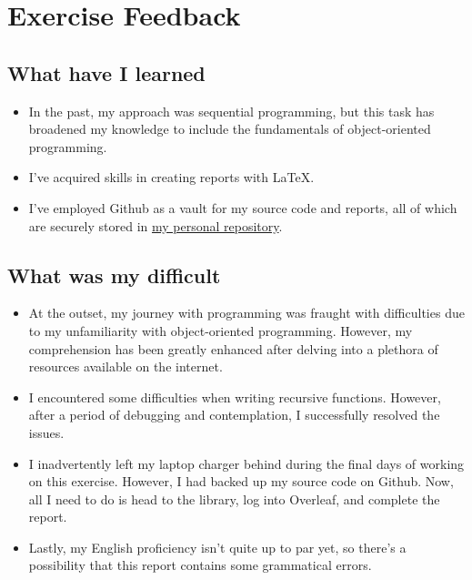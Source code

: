 \section{Exercise Feedback}

\subsection{What have I learned}
\begin{itemize}
    \item In the past, my approach was sequential programming, but this task has broadened my knowledge to include the fundamentals of object-oriented programming.
    \item I’ve acquired skills in creating reports with \LaTeX.
    \item I’ve employed Github as a vault for my source code and reports, all of which are securely stored in \href{https://github.com/KhoaNguyen-HCMUS/HCMUS-course}{my personal repository}.
\end{itemize}
\subsection{What was my difficult}
\begin{itemize}
    \item At the outset, my journey with programming was fraught with difficulties due to my unfamiliarity with object-oriented programming. However, my comprehension has been greatly enhanced after delving into a plethora of resources available on the internet. \cite{OOP_in_C++}
    \item I encountered some difficulties when writing recursive functions. However, after a period of debugging and contemplation, I successfully resolved the issues.
    \item I inadvertently left my laptop charger behind during the final days of working on this exercise. However, I had backed up my source code on Github. Now, all I need to do is head to the library, log into Overleaf, and complete the report.
    \item Lastly, my English proficiency isn’t quite up to par yet, so there’s a possibility that this report contains some grammatical errors.
\end{itemize}


